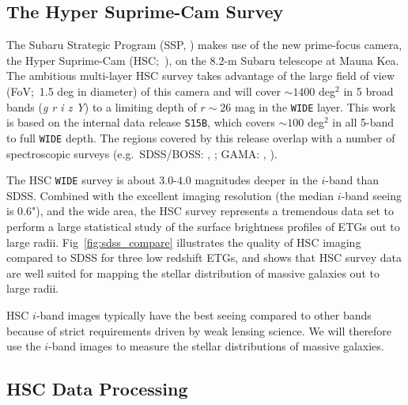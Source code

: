 \documentclass{emulateapj}
\begin{document}
\begin{CJK*}{UTF8}{gbsn}
\subsection{The Hyper Suprime-Cam Survey}
    \label{ssec:hsc}

    The Subaru Strategic Program (SSP, \citealt{MiyazakiInPrep}) makes use of the new 
    prime-focus camera, the Hyper Suprime-Cam (HSC;~\citealt{Miyazaki2012}), on the 
    8.2-m Subaru telescope at Mauna Kea. 
    The ambitious multi-layer HSC survey takes advantage of the large field of 
    view (FoV;~1.5 deg in diameter) of this camera and will cover $\sim 1400$ deg$^2$ 
    in 5 broad bands (\textit{g r i z Y}) to a limiting depth of $r \sim 26$ mag 
    in the \texttt{WIDE} layer. 
    This work is based on the internal data release \texttt{S15B}, which covers 
    $\sim 100$ deg$^2$ in all 5-band to full \texttt{WIDE} depth.  
    The regions covered by this release overlap with a number of spectroscopic surveys 
    (e.g.\ SDSS/BOSS: \citealt{Eisenstein2011}, \citealt{Alam2015}; 
    GAMA: \citealt{Driver2011}, \citealt{Liske2015}).

    The HSC \texttt{WIDE} survey is about $3.0$-$4.0$ magnitudes deeper in the $i$-band 
    than SDSS. 
    Combined with the excellent imaging resolution (the median $i$-band seeing is 0.6"), 
    and the wide area, the HSC survey represents a tremendous data set to perform a 
    large statistical study of the surface brightness profiles of ETGs out to large radii.     
    Fig~\ref{fig:sdss_compare} illustrates the quality of HSC imaging compared to SDSS 
    for three low redshift ETGs, and shows that HSC survey data are well suited for 
    mapping the stellar distribution of massive galaxies out to large radii.

	HSC $i$-band images typically have the best seeing compared to other bands because 
	of strict requirements driven by weak lensing science. 
    We will therefore use the $i$-band images to measure the stellar distributions of 
    massive galaxies.
    
\subsection{HSC Data Processing}
    \label{sec:pipeline}


\end{CJK*}
\end{document}
